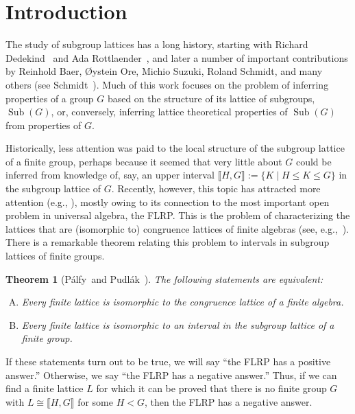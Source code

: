 \documentclass{gen-j-l}
\newcommand{\lb}{\ensuremath{\llbracket}}
\newcommand{\rb}{\ensuremath{\rrbracket}}
\newcommand{\<}{\ensuremath{\langle}}
\renewcommand{\>}{\ensuremath{\rangle}}
\theoremstyle{plain}
\newtheorem{theorem}{Theorem}[section]
\theoremstyle{definition}
\theoremstyle{remark}
\numberwithin{theorem}{section}
\numberwithin{claim}{section}
\numberwithin{equation}{section}
\numberwithin{conjecture}{section}
\newcommand{\Palfy}{P\'alfy}
\newcommand{\Pudlak}{Pudl\'ak}
\renewcommand{\leq}{\ensuremath{\leqslant}}
\newcommand{\Sub}{\ensuremath{\operatorname{Sub}}}
\newcommand{\2}{\ensuremath{\mathbf{2}}}
\newcommand{\3}{\ensuremath{\mathbf{3}}}
\begin{document}


\section{Introduction}
\label{sec:intro}
The study of subgroup lattices has a long history, starting with 
Richard Dedekind~\cite{Dedekind:1877} 
and 
Ada Rottlaender~\cite{Rottlaender:1928}, and
later a number of important contributions by Reinhold Baer, 
{\O}ystein Ore, 
Michio Suzuki, 
Roland Schmidt, 
and many others (see Schmidt~\cite{Schmidt:1994}).
Much of this work focuses on the problem of inferring
properties of a group $G$ based on the structure of its lattice of subgroups,
$\Sub(G)$,  or, conversely,  inferring lattice theoretical properties of $\Sub(G)$ from properties of
$G$. 

Historically, less attention was paid to the local structure of the
subgroup lattice of a finite group, perhaps because it seemed that very little
about $G$ could be inferred from knowledge of, say, an upper
  interval $\lb H,G \rb := \{K \mid H\leq K \leq G\}$ in the subgroup lattice of $G$.
Recently, however, this topic has attracted more attention (e.g.,
\cite{Aschbacher:2009,Lucchini:1997,Basile:2001,Borner:1999,Kohler:1983,Lucchini:1994a,Palfy:1988,Palfy:1995}),
mostly owing to its connection to the most important open problem in
universal algebra,
the \ac{FLRP}. This is the problem of
characterizing the lattices that are (isomorphic to) congruence lattices of
finite algebras (see, e.g.,~\cite{Berman:1970,DeMeo:thesis,Palfy:1995,Palfy:2001}). 
There is a remarkable theorem relating this problem to intervals in subgroup
lattices of finite groups. 
\begin{theorem}[\Palfy\ and \Pudlak~\cite{Palfy:1980}]
\label{thm:P5}
The following statements are equivalent:
\begin{enumerate}[(A)]
\item Every finite lattice is isomorphic to
  the congruence lattice of a finite algebra.
\item Every finite lattice is isomorphic to
  an interval in the subgroup lattice of a finite group.
\end{enumerate}
\end{theorem}
If these statements turn out to be true, we will say ``the \acs{FLRP} has
a positive answer.'' Otherwise, we say ``the \acs{FLRP} has a negative answer.''
Thus, if we can find a finite lattice $L$ for which it can be proved that there
is no finite group $G$ with $L \cong \lb H,G \rb$ for some $H< G$, then the
\acs{FLRP} has a negative answer.  
\end{document}
